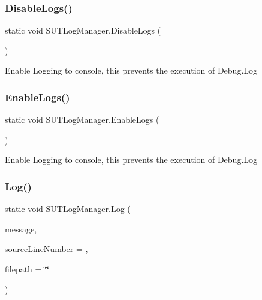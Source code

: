 \subsubsection{\texorpdfstring{Disable\+Logs()}{DisableLogs()}}
{\footnotesize\ttfamily static void S\+U\+T\+Log\+Manager.\+Disable\+Logs (\begin{DoxyParamCaption}{ }\end{DoxyParamCaption})\hspace{0.3cm}{\ttfamily [static]}}



Enable Logging to console, this prevents the execution of Debug.\+Log 

\mbox{\label{class_s_u_t_log_manager_a5493cf91256613ca690ed94a977647ff}} 
\subsubsection{\texorpdfstring{Enable\+Logs()}{EnableLogs()}}
{\footnotesize\ttfamily static void S\+U\+T\+Log\+Manager.\+Enable\+Logs (\begin{DoxyParamCaption}{ }\end{DoxyParamCaption})\hspace{0.3cm}{\ttfamily [static]}}



Enable Logging to console, this prevents the execution of Debug.\+Log 

\mbox{\label{class_s_u_t_log_manager_a93ab3606fa0ca251e796f9383537c7ca}} 
\subsubsection{\texorpdfstring{Log()}{Log()}\hspace{0.1cm}{\footnotesize\ttfamily [1/2]}}
{\footnotesize\ttfamily static void S\+U\+T\+Log\+Manager.\+Log (\begin{DoxyParamCaption}\item[{object}]{message,  }\item[{\mbox{[}\+Caller\+Line\+Number\mbox{]} int}]{source\+Line\+Number = {},  }\item[{\mbox{[}\+Caller\+File\+Path\mbox{]} string}]{filepath = {\ttfamily \char`\"{}\char`\"{}} }\end{DoxyParamCaption})\hspace{0.3cm}{\ttfamily [static]}}




